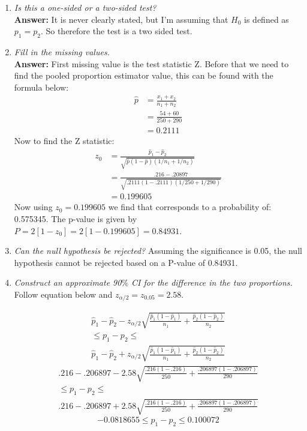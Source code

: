\documentclass[11pt]{article}
\begin{document}
\begin{enumerate}
\item \emph{Is this a one-sided or a two-sided test?}
\\\textbf{Answer:} It is never clearly stated, but I'm assuming that $H_0$ is defined as $p_1 = p_2$. So therefore the test is a two sided test.
\item \emph{Fill in the missing values.}
\\\textbf{Answer:} First missing value is the test statistic Z. Before that we need to find the pooled proportion estimator value, this can be found with the formula below:
\begin{equation}
\begin{split}
\hat{p} &= \frac{x_1 + x_2}{n_1 + n_2}\\
&= \frac{54 + 60}{250+290} \\
&=0.2111 
\end{split}
\end{equation}
Now to find the Z statistic:
\begin{equation}
\begin{split}
z_0 &= \frac{\hat{p}_1 - \hat{p}_2}{\sqrt{\hat{p}(1 - \hat{p})(1/n_1 + 1/n_2)}}  \\
&= \frac{.216 - .20897}{\sqrt{.2111(1 - .2111)(1/250 + 1/290)}} \\
&= 0.199605
\end{split}
\end{equation}
Now using $z_0 =  0.199605$ we find that corresponds to a probability of: 0.575345. The p-value is given by $P = 2[1 - z_0] = 2[1 - 0.199605] = 0.84931$. \\
\item \emph{Can the null hypothesis be rejected?}
Assuming the significance is 0.05, the null hypothesis cannot be rejected based on a P-value of 0.84931.
\item \emph{Construct an approximate 90$\%$ CI for the difference in the two proportions.}
Follow equation below and $z_{\alpha/2} = z_{0.05} = 2.58$.

\begin{multline}
\hat{p}_1 - \hat{p}_2 - z_{\alpha/2}\sqrt{\frac{\hat{p}_1(1-\hat{p}_1)}{n_1} + \frac{\hat{p}_2(1 - \hat{p}_2)}{n_2}}\\ \leq p_1 - p_2  \leq \\
\hat{p}_1 - \hat{p}_2 + z_{\alpha/2}\sqrt{\frac{\hat{p}_1(1-\hat{p}_1)}{n_1} + \frac{\hat{p}_2(1 - \hat{p}_2)}{n_2}}
\end{multline}
\begin{multline}
.216 - .206897 - 2.58\sqrt{\frac{.216(1-.216)}{250} + \frac{.206897(1 - .206897)}{290}}\\
 \leq p_1 - p_2 \leq \\
.216 - .206897 + 2.58\sqrt{\frac{.216(1-.216)}{250} + \frac{.206897(1 - .206897)}{290}} 
\end{multline}
\begin{equation}
-0.0818655 \leq p_1 - p_2 \leq 0.100072
\end{equation}


\end{enumerate}
\end{document}
